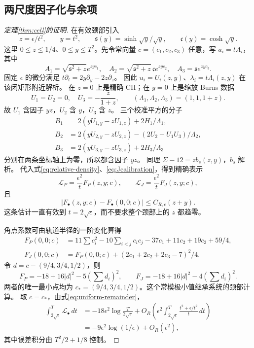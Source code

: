 \documentclass[UTF8,11pt,a4paper,fontset=none]{ctexart}
\numberwithin{equation}{section}
\theoremstyle{definition}
\theoremstyle{remark}\newtheorem{remark}[theorem]{说明}
\begin{document}
\subsection{两尺度因子化与余项}
\begin{proof}[定理\ref{thm:cell}的证明]
在有效颈部引入
\[
z=\epsilon/t^2,\qquad y=t^2,\qquad
\mathfrak s(y)=\sinh\sqrt y/\sqrt y,\qquad\mathfrak c(y)=\cosh\sqrt y.
\]
这里 $0\le z\le1/4$、$0\le y\le T^2$。先令常向量 $c=(c_1,c_2,c_3)$ 任意，写 $a_i=tA_i$，其中
\[
A_1=\sqrt{\mathfrak s^2+z}e^{zyc_1},\quad
A_2=\sqrt{\mathfrak s^2+z}\,\mathfrak c e^{zyc_2},\quad
A_3=\mathfrak s e^{zyc_3}.
\]
固定 $\epsilon$ 的微分满足 $t\partial_t=2y\partial_y-2z\partial_z$。
因此 $u_i=U_i(z,y)$、$\lambda_i=t\Lambda_i(z,y)$ 在该闭矩形附近解析。
在 $z=0$ 上是精确 CH；在 $y=0$ 上是缩放 Burns 数据
\[
U_1=U_2=0,\quad U_3=-\frac z{1+z},\qquad
(\Lambda_1,\Lambda_2,\Lambda_3)=(1,1,1+z).
\]
故 $U_1$ 含因子 $yz$，$U_2$ 含 $y$，$U_3$ 含 $z$。
三个校准平方的分子
\begin{align*}
B_1&=2(yU_{1,y}-zU_{1,z})+2H_1/\Lambda_1,\\
B_2&=2(yU_{2,y}-zU_{2,z})-(2U_2-U_1U_3)/\Lambda_2,\\
B_3&=2(yU_{3,y}-zU_{3,z})+2H_3/\Lambda_3
\end{align*}
分别在两条坐标轴上为零，所以都含因子 $yz$。
同理 $\Sigma-12=z b_s(z,y)$，$b_s$ 解析。
代入式\eqref{eq:relative-density}、\eqref{eq:Jcalibration}，得到精确表示
\begin{equation}\label{eq:factorization}
\mathscr L_P=\frac{\epsilon^2}{t}F_P(z,y;c),\qquad
\mathscr L_J=\frac{\epsilon^2}{t}F_J(z,y;c),
\end{equation}
且
\begin{equation}\label{eq:uniform-remainder}
|F_\bullet(z,y;c)-F_\bullet(0,0;c)|\le C_{R,c}(z+y).
\end{equation}
这条估计一直有效到 $t=2\sqrt\epsilon$，而不要求整个颈部上的 $z$ 都趋零。

角点系数可由轨道半径的一阶变化算得
\begin{align*}
F_P(0,0;c)&=11\sum c_i^2-10\sum_{i<j}c_ic_j-37c_1+11c_2+19c_3+59/4,\\
F_J(0,0;c)&=F_P(0,0;c)+(2c_1+2c_2+2c_3-7)^2/4.
\end{align*}
令 $d=c-(9/4,3/4,1/2)$，则
\begin{equation}\label{eq:neck-min}
F_P=-18+16|d|^2-5(\textstyle\sum d_i)^2,
\qquad
F_J=-18+16|d|^2-4(\textstyle\sum d_i)^2.
\end{equation}
两者的唯一最小点均为 $c_*=(9/4,3/4,1/2)$。这个常模极小值继承系统的颈部计算\cite{CellSource}。
取 $c=c_*$，由式\eqref{eq:uniform-remainder}，
\begin{align*}
\int_{2\sqrt\epsilon}^T\mathscr L_\bullet\,dt
&=-18\epsilon^2\log\frac{T}{2\sqrt\epsilon}
+O_R\left(\epsilon^2\int_{2\sqrt\epsilon}^T\frac{t^2+\epsilon/t^2}{t}\,dt\right)\\
&=-9\epsilon^2\log(1/\epsilon)+O_R(\epsilon^2),
\end{align*}
其中误差积分由 $T^2/2+1/8$ 控制。


\end{proof}
\end{document}

